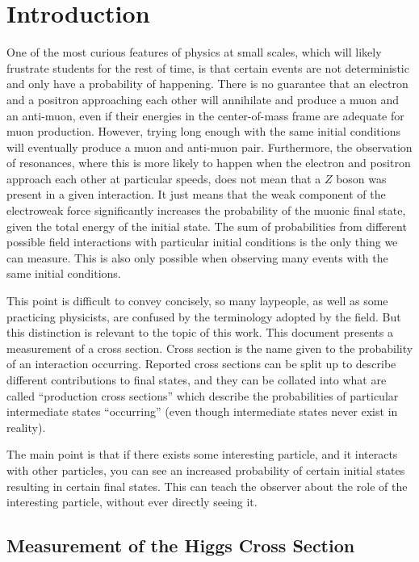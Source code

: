 \chapter{Introduction} \label{ch:intro}

One of the most curious features of physics at small scales,
which will likely frustrate students for the rest of time,
is that certain events are not deterministic and only have a probability of happening.
There is no guarantee that an electron and a positron
approaching each other will annihilate and produce a muon and an anti-muon,
even if their energies in the center-of-mass frame are adequate for muon production.
However, trying long enough with the same initial conditions will eventually
produce a muon and anti-muon pair.
Furthermore, the observation of resonances, where this is more likely to happen
when the electron and positron approach each other at particular speeds,
does not mean that a $Z$ boson was present in a given interaction.
It just means that the weak component of the electroweak force significantly increases
the probability of the muonic final state, given the total energy of the initial state.
The sum of probabilities from different possible field interactions with
particular initial conditions is the only thing we can measure.
This is also only possible when observing many events with the same initial conditions.

This point is difficult to convey concisely, so many laypeople,
as well as some practicing physicists, are confused by the terminology adopted by the field.
But this distinction is relevant to the topic of this work.
This document presents a measurement of a cross section.
Cross section is the name given to the probability of an interaction occurring.
Reported cross sections can be split up to describe different contributions to final states,
and they can be collated into what are called ``production cross sections'' which describe
the probabilities of particular intermediate states ``occurring''
(even though intermediate states never exist in reality).

The main point is that if there exists some interesting particle,
and it interacts with other particles,
you can see an increased probability of certain initial states
resulting in certain final states.
This can teach the observer about the role of the interesting particle,
without ever directly seeing it.

\section{Measurement of the Higgs Cross Section}

